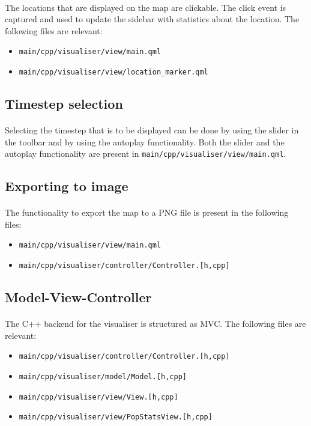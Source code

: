 \documentclass{article}
\begin{document}
\paragraph{} The locations that are displayed on the map are clickable. The click event is captured and used to update the sidebar with statistics about the location. The following files are relevant:
\begin{itemize}
\item \texttt{main/cpp/visualiser/view/main.qml}
\item \texttt{main/cpp/visualiser/view/location\_marker.qml}
\end{itemize}

\subsection{Timestep selection}

\paragraph{} Selecting the timestep that is to be displayed can be done by using the slider in the toolbar and by using the autoplay functionality. Both the slider and the autoplay functionality are present in \texttt{main/cpp/visualiser/view/main.qml}.

\subsection{Exporting to image}

\paragraph{} The functionality to export the map to a PNG file is present in the following files:
\begin{itemize}
\item \texttt{main/cpp/visualiser/view/main.qml}
\item \texttt{main/cpp/visualiser/controller/Controller.[h,cpp]}
\end{itemize}

\subsection{Model-View-Controller}

\paragraph{} The C++ backend for the visualiser is structured as MVC. The following files are relevant:
\begin{itemize}
\item \texttt{main/cpp/visualiser/controller/Controller.[h,cpp]}
\item \texttt{main/cpp/visualiser/model/Model.[h,cpp]}
\item \texttt{main/cpp/visualiser/view/View.[h,cpp]}
\item \texttt{main/cpp/visualiser/view/PopStatsView.[h,cpp]}
\end{itemize}
\end{document}
